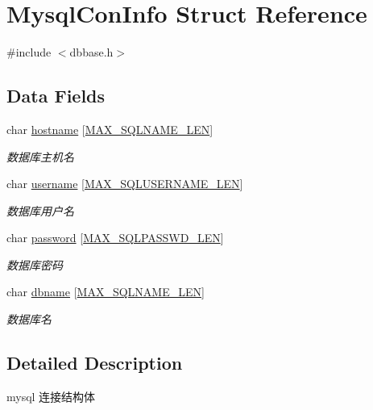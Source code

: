 \hypertarget{structMysqlConInfo}{\section{Mysql\-Con\-Info Struct Reference}
\label{structMysqlConInfo}
}


{\ttfamily \#include $<$dbbase.\-h$>$}

\subsection*{Data Fields}
\begin{DoxyCompactItemize}
\item 
char \hyperlink{structMysqlConInfo_a9382fdbd16ae319c1ad0a76b2362bd46}{hostname} \mbox{[}\hyperlink{dbbase_8h_a06a9cf374e83dcac0620e5095f79234e}{M\-A\-X\-\_\-\-S\-Q\-L\-N\-A\-M\-E\-\_\-\-L\-E\-N}\mbox{]}
\begin{DoxyCompactList}\small\item\em 数据库主机名 \end{DoxyCompactList}\item 
char \hyperlink{structMysqlConInfo_a2753d5c9d81aba6435ad503db842775d}{username} \mbox{[}\hyperlink{dbbase_8h_a998c6ce37817a02bf23a1a2c6fd15cb0}{M\-A\-X\-\_\-\-S\-Q\-L\-U\-S\-E\-R\-N\-A\-M\-E\-\_\-\-L\-E\-N}\mbox{]}
\begin{DoxyCompactList}\small\item\em 数据库用户名 \end{DoxyCompactList}\item 
char \hyperlink{structMysqlConInfo_a429e8aae687715a9ec374435c026f939}{password} \mbox{[}\hyperlink{dbbase_8h_ae5cf418bda87e648ae461cfbca7e2f8e}{M\-A\-X\-\_\-\-S\-Q\-L\-P\-A\-S\-S\-W\-D\-\_\-\-L\-E\-N}\mbox{]}
\begin{DoxyCompactList}\small\item\em 数据库密码 \end{DoxyCompactList}\item 
char \hyperlink{structMysqlConInfo_a82550a94a5bc9800f388752f01964c1c}{dbname} \mbox{[}\hyperlink{dbbase_8h_a06a9cf374e83dcac0620e5095f79234e}{M\-A\-X\-\_\-\-S\-Q\-L\-N\-A\-M\-E\-\_\-\-L\-E\-N}\mbox{]}
\begin{DoxyCompactList}\small\item\em 数据库名 \end{DoxyCompactList}\end{DoxyCompactItemize}


\subsection{Detailed Description}
mysql 连接结构体 

